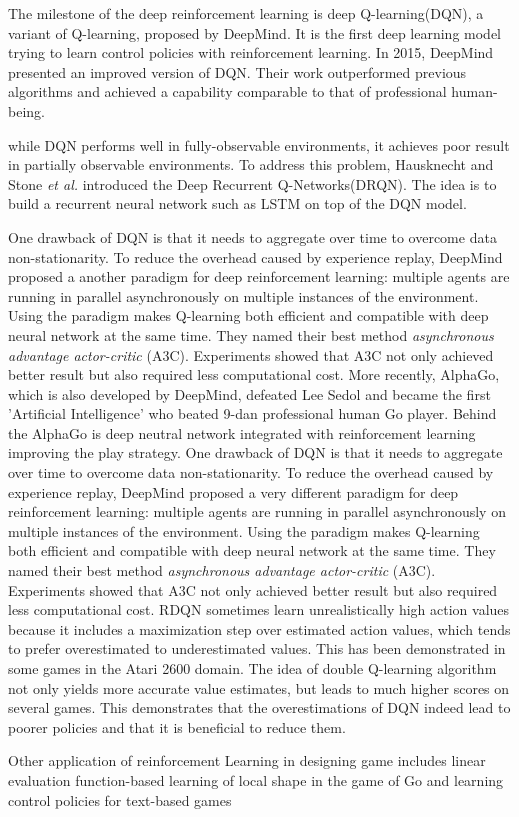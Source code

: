 
The milestone of the deep reinforcement learning is deep Q-learning(DQN)\cite{mnih2013playing}, a variant of Q-learning, proposed by DeepMind. It is the first deep learning model trying to learn control policies with reinforcement learning. In 2015, DeepMind presented an improved version of DQN\cite{mnih2015human}. Their work outperformed previous algorithms and achieved a capability comparable to that of professional human-being.
%

while DQN performs well in fully-observable environments, it achieves poor result in partially observable environments. To address this problem, Hausknecht and Stone\textit{ et al.} \cite{hausknecht2015deep} introduced the Deep Recurrent Q-Networks(DRQN). The idea is to build a recurrent neural network such as LSTM on top of the DQN model.
%

One drawback of DQN is that it needs to aggregate over time to overcome data non-stationarity. To reduce the overhead caused by experience replay, DeepMind \cite{mnih2016asynchronous} proposed a another paradigm for deep reinforcement learning: multiple agents are running in parallel asynchronously on multiple instances of the environment. Using the paradigm makes Q-learning both efficient and compatible with deep neural network at the same time. They named their best method \textit{asynchronous advantage actor-critic} (A3C). Experiments showed that A3C not only achieved better result but also required less computational cost.
%
More recently, AlphaGo\cite{brockman2016openai}, which is also developed by DeepMind, defeated Lee Sedol and became the first 'Artificial Intelligence' who beated 9-dan professional human Go player. Behind the AlphaGo is deep neutral network integrated with reinforcement learning improving the play strategy.
%
One drawback of DQN is that it needs to aggregate over time to overcome data non-stationarity. To reduce the overhead caused by experience replay, DeepMind \cite{mnih2016asynchronous} proposed a very different paradigm for deep reinforcement learning: multiple agents are running in parallel asynchronously on multiple instances of the environment. Using the paradigm makes Q-learning both efficient and compatible with deep neural network at the same time. They named their best method \textit{asynchronous advantage actor-critic} (A3C). Experiments showed that A3C not only achieved better result but also required less computational cost.
%
RDQN sometimes learn unrealistically high action values because it includes a maximization step over estimated action values, which tends to
prefer overestimated to underestimated values. This has been demonstrated in some games in the Atari 2600 domain. The idea of double Q-learning algorithm \cite{van2015deep} not only yields more accurate value estimates, but leads to much higher scores on several games. This demonstrates that the overestimations of DQN indeed lead to poorer policies and that it is beneficial to reduce them.

Other application of reinforcement Learning in designing game includes linear evaluation function-based learning of local shape in the game of Go \cite{silver2007reinforcement} and learning control policies for text-based games \cite{narasimhan2015language}